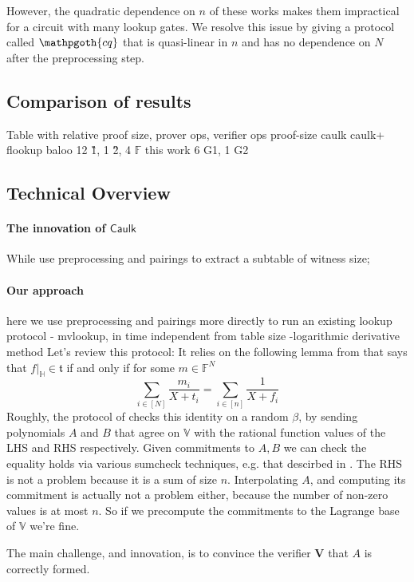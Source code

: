 \documentclass[11pt]{article} %
\newcommand{\cq}{\ensuremath{\mathpgoth{cq} }\xspace}
\newcommand{\caulk}{\ensuremath{\mathsf{Caulk}}\xspace}
\newcommand{\F}{\ensuremath{\mathbb F}\xspace}
\newcommand{\ver}{\ensuremath{\mathsf{\mathbf{V}}}\xspace}
\newcommand{\sumi}[1]{\sum_{i\in[#1]}}
\newcommand{\restricttoset}[2]{\ensuremath{#1|_{#2}}\xspace}
\newcommand{\subspace}{\ensuremath{\mathbb{H}}\xspace}
\newcommand{\bigspace}{\ensuremath{\mathbb{V}}\xspace}
\newcommand{\witsize}{\ensuremath{n}\xspace}
\newcommand{\tabsize}{\ensuremath{N}\xspace}
\newcommand{\tab}{\ensuremath{\mathfrak{t}}\xspace}
\begin{document}
However, the quadratic dependence on \witsize  of these works makes them impractical for a circuit with many lookup gates.
We resolve this issue by giving a protocol called \cq that is quasi-linear in \witsize and has no dependence on \tabsize after the preprocessing step.

\subsection{Comparison of results}

Table with relative proof size, prover ops, verifier ops
                proof-size
caulk
caulk+
flookup
baloo         12 \G1, 1 \G2, 4 \F
this work  6 G1, 1 G2

\subsection{Technical Overview}
\paragraph{The innovation of \caulk }
While \cite{caulk,caulkp,flookup,baloo} use preprocessing and pairings to extract a subtable of witness size;


\paragraph{Our approach}
here we use preprocessing and pairings more directly to run an existing lookup protocol - mvlookup,
in time independent from table size
-logarithmic derivative method
Let's review this protocol:
It relies on the following lemma from \cite{mvlookup}
that says that $\restricttoset{f}{\subspace}\in \tab$ if and only if for some $m\in \F^\tabsize$
 \[\sumi{\tabsize}\frac{m_i}{X+t_i}=\sumi{\witsize}\frac{1}{X+f_i}\]
Roughly, the protocol of \cite{mvlookup} checks this identity on a random $\beta$,
by sending polynomials $A$ and $B$ that agree on \bigspace with the rational function values of the LHS and RHS
respectively.
Given commitments to $A,B$ we can check the equality holds via various sumcheck techniques, e.g. that descirbed in \cite{aurora}.
The RHS is not a problem because it is a sum of size \witsize.
Interpolating $A$, and computing its commitment is actually not a problem either, because the number of non-zero values
is at most \witsize. So if we precompute the commitments to the Lagrange base of  \bigspace we're fine.

The main challenge, and innovation, is to convince the verifier \ver that $A$ is correctly formed.
\end{document}
